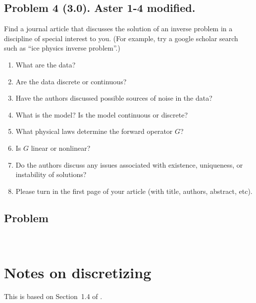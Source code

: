 \documentclass[11pt,titlepage,fleqn]{article}
\begin{document}
\pagebreak
\subsection*{Problem 4 (3.0). Aster 1-4 modified.}

Find a journal article that discusses the solution of an inverse problem in a discipline of special interest to you. (For example, try a google scholar search such as ``ice physics inverse problem''.)
%
\begin{enumerate}
\item What are the data?
\item Are the data discrete or continuous?
\item Have the authors discussed possible sources of noise in the data?
\item What is the model? Is the model continuous or discrete?
\item What physical laws determine the forward operator $G$?
\item Is $G$ linear or nonlinear?
\item Do the authors discuss any issues associated with existence, uniqueness, or instability of solutions?
\item Please turn in the first page of your article (with title, authors, abstract, etc).
\end{enumerate}


\subsection*{Problem} \howmuchtime\

\nocite{Aster}




\appendix

\pagebreak

\section{Notes on discretizing}

This is based on Section~1.4 of \citet{Aster}.
\end{document}
